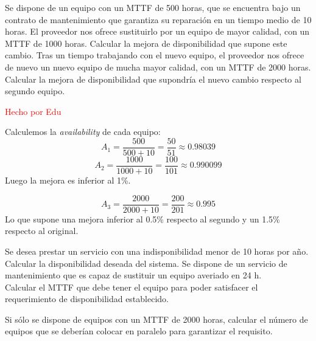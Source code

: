 \begin{problem}[1]
Se dispone de un equipo con un MTTF de 500 horas, que se encuentra bajo un contrato de mantenimiento que garantiza su reparación en un tiempo medio de 10 horas.
  \ppart El proveedor nos ofrece sustituirlo por un equipo de mayor calidad, con un MTTF de 1000 horas. Calcular la mejora de disponibilidad que supone este cambio.
  \ppart Tras un tiempo trabajando con el nuevo equipo, el proveedor nos ofrece de nuevo un nuevo equipo de mucha mayor calidad, con un MTTF de 2000 horas. Calcular la mejora de disponibilidad que supondría el nuevo cambio respecto al segundo equipo.

\solution
\textcolor{red}{Hecho por Edu}

\spart
  Calculemos la \textit{availability} de cada equipo:
  \[ A_1 = \frac{500}{500+10} = \frac{50}{51} \approx 0.98039 \]
  \[ A_2 = \frac{1000}{1000+10} = \frac{100}{101} \approx 0.990099 \]
  Luego la mejora es inferior al 1\%.

\spart
  \[ A_3 = \frac{2000}{2000+10} = \frac{200}{201} \approx 0.995 \]
  Lo que supone una mejora inferior al 0.5\% respecto al segundo y un 1.5\% respecto al original.

\end{problem}

\begin{problem}[2]
Se desea prestar un servicio con una indisponibilidad menor de 10 horas por
año.
  \ppart Calcular la disponibilidad deseada del sistema.
  \ppart Se dispone de un servicio de mantenimiento que es capaz de sustituir un equipo averiado en 24 h.\\
Calcular el MTTF que debe tener el equipo para poder satisfacer el requerimiento de disponibilidad establecido.

  \ppart Si sólo se dispone de equipos con un MTTF de 2000 horas, calcular el número de equipos que se deberían colocar en paralelo para garantizar el requisito.

\solution


\end{problem}

